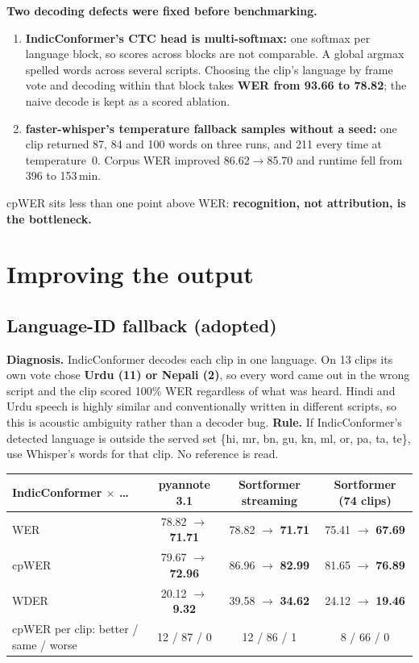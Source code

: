 \documentclass[10pt]{article}
\newcommand{\ra}{$\rightarrow$}
\newcommand{\x}{$\times$}
\begin{document}
\textbf{Two decoding defects were fixed before benchmarking.}
\begin{enumerate}
  \item \textbf{IndicConformer's CTC head is multi-softmax:} one softmax per language block, so scores across blocks are
        not comparable. A global argmax spelled words across several scripts. Choosing the clip's language by
        frame vote and decoding within that block takes \textbf{WER from 93.66 to 78.82}; the naive decode is kept as
        a scored ablation.
  \item \textbf{faster-whisper's temperature fallback samples without a seed:} one clip returned 87, 84 and 100
        words on three runs, and 211 every time at temperature~0. Corpus WER improved 86.62\ra85.70 and runtime fell
        from 396 to 153\,min.
\end{enumerate}
cpWER sits less than one point above WER: \textbf{recognition, not attribution, is the bottleneck.}

\section{Improving the output}

\subsection{Language-ID fallback (adopted)}

\textbf{Diagnosis.} IndicConformer decodes each clip in one language. On 13 clips its own vote chose
\textbf{Urdu (11) or Nepali (2)}, so every word came out in the wrong script and the clip scored 100\% WER regardless
of what was heard. Hindi and Urdu speech is highly similar and conventionally written in different scripts, so this
is acoustic ambiguity rather than a decoder bug.
\textbf{Rule.} If IndicConformer's detected language is outside the served set
\{hi, mr, bn, gu, kn, ml, or, pa, ta, te\}, use Whisper's words for that clip. No reference is read.

\begin{center}\footnotesize
\begin{tabular}{@{}lccc@{}}
\toprule
IndicConformer \x{} \dots & pyannote 3.1 & Sortformer streaming & Sortformer (74 clips)\\
\midrule
WER   & 78.82 \ra{} \textbf{71.71} & 78.82 \ra{} \textbf{71.71} & 75.41 \ra{} \textbf{67.69}\\
cpWER & 79.67 \ra{} \textbf{72.96} & 86.96 \ra{} \textbf{82.99} & 81.65 \ra{} \textbf{76.89}\\
WDER  & 20.12 \ra{} \textbf{9.32}  & 39.58 \ra{} \textbf{34.62} & 24.12 \ra{} \textbf{19.46}\\
cpWER per clip: better / same / worse & 12 / 87 / 0 & 12 / 86 / 1 & 8 / 66 / 0\\
\bottomrule
\end{tabular}
\end{center}
\end{document}
